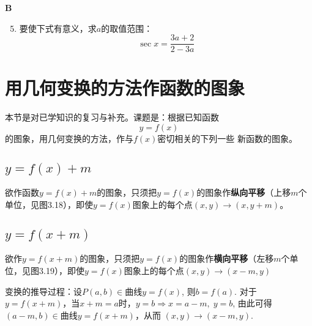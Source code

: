 \begin{center}
    \bfseries B
\end{center}

\begin{enumerate}\setcounter{enumi}{4}
    \item 要使下式有意义，求$a$的取值范围：$$\sec x=\frac{3a+2}{2-3a}$$
\end{enumerate}

\section{用几何变换的方法作函数的图象}
本节是对已学知识的复习与补充。课题是：根据已知函数
\begin{equation}
 y=f(x)\tag{*}   
\end{equation}
的图象，用几何变换的方法，作与$f(x)$密切相关的下列一些
新函数的图象。

\subsection{$y=f(x)+m$}
欲作函数$y=f(x)+m$的图象，只须把$y=f(x)$的图象作\textbf{纵向平移}（上移$m$个单位，见图3.18），即使$y=f(x)$图象上的每个点$(x,y)\to (x,y+m)$。

\begin{figure}[htp]
    \centering
{}
    \caption{}
\end{figure}




\subsection{$y=f(x+m)$}
欲作$y=f(x+m)$的图象，只须把$y=f(x)$的图象作\textbf{横向平移}（左移$m$个单位，见图3.19），即使$y=f(x)$图象上的每个点$(x,y)\to (x-m,y)$

变换的推导过程：设$P(a,b)\in $曲线$y=f(x)$, 则$b=f(a)$. 对于$y=f(x+m)$，当$x+m=a$时，$y=b\Longrightarrow x=a-m,\; y=b$, 
由此可得$(a-m,b)\in $曲线$y=f(x+m)$，从而
$(x,y)\to (x-m,y)$.

